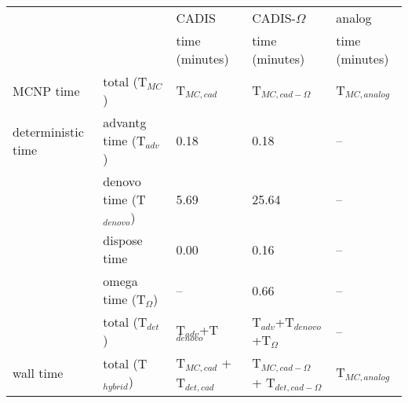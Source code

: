 \begin{tabular}{L{2.5cm}L{3cm}C{3cm}C{4cm}C{2cm}}
\toprule
          &              &          CADIS &   CADIS-$\Omega$ &         analog \\
          &              & time (minutes) & time (minutes)   & time (minutes) \\
\midrule
MCNP time &  total (T$_{MC}$) &         T$_{MC,cad}$ &     T$_{MC,cad-\Omega}$ & T$_{MC,analog}$  \\
deterministic time & advantg time (T$_{adv}$) &           0.18 &           0.18 &            -- \\
    & denovo time (T$_{denovo}$) &           5.69   &          25.64 &            -- \\
                   & dispose time &           0.00  &           0.16 &            -- \\
                   & omega time (T$_{\Omega}$)&    --      &           0.66 &            -- \\
                   & total (T$_{det}$) &  T$_{adv}$+T$_{denovo}$  &
                   T$_{adv}$+T$_{denovo}$+T$_{\Omega}$ &            -- \\
wall time & total (T$_{hybrid}$) &  T$_{MC,cad}$ + T$_{det,cad}$ &  T$_{MC,cad-\Omega}$ + T$_{det,
cad-\Omega}$ &  T$_{MC,analog}$  \\
\bottomrule
\end{tabular}
